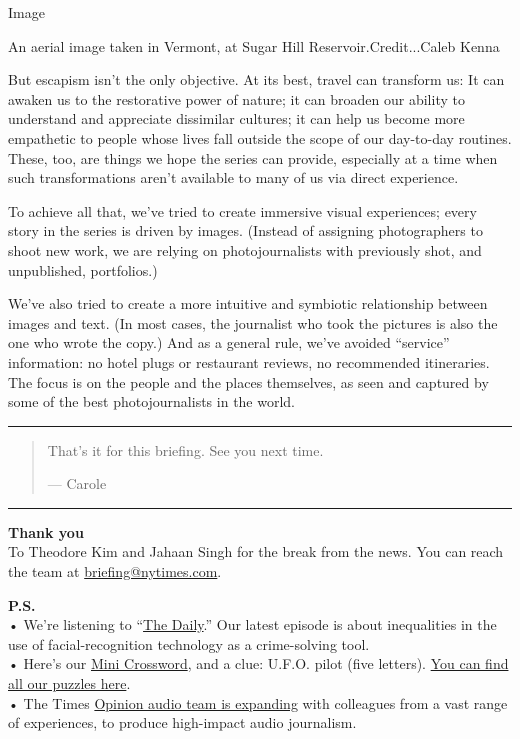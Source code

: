 Image

An aerial image taken in Vermont, at Sugar Hill Reservoir.Credit...Caleb
Kenna

But escapism isn't the only objective. At its best, travel can transform
us: It can awaken us to the restorative power of nature; it can broaden
our ability to understand and appreciate dissimilar cultures; it can
help us become more empathetic to people whose lives fall outside the
scope of our day-to-day routines. These, too, are things we hope the
series can provide, especially at a time when such transformations
aren't available to many of us via direct experience.

To achieve all that, we've tried to create immersive visual experiences;
every story in the series is driven by images. (Instead of assigning
photographers to shoot new work, we are relying on photojournalists with
previously shot, and unpublished, portfolios.)

We've also tried to create a more intuitive and symbiotic relationship
between images and text. (In most cases, the journalist who took the
pictures is also the one who wrote the copy.) And as a general rule,
we've avoided ``service'' information: no hotel plugs or restaurant
reviews, no recommended itineraries. The focus is on the people and the
places themselves, as seen and captured by some of the best
photojournalists in the world.

\begin{center}\rule{0.5\linewidth}{\linethickness}\end{center}

\begin{quote}
That's it for this briefing. See you next time.

--- Carole
\end{quote}

\begin{center}\rule{0.5\linewidth}{\linethickness}\end{center}

\textbf{Thank you}\\
To Theodore Kim and Jahaan Singh for the break from the news. You can
reach the team at
\href{mailto:briefing+pm@nytimes.com?subject=Briefing\%20Feedback}{briefing@nytimes.com}.

\textbf{P.S.}\\
• We're listening to ``\href{https://www.nytimes.com/thedaily}{The
Daily}.'' Our latest episode is about inequalities in the use of
facial-recognition technology as a crime-solving tool.\\
• Here's our \href{https://www.nytimes.com/crosswords/game/mini}{Mini
Crossword}, and a clue: U.F.O. pilot (five letters).
\href{https://www.nytimes.com/crosswords}{You can find all our puzzles
here}.\\
• The Times
\href{https://www.nytco.com/press/introducing-the-opinion-audio-team/}{Opinion
audio team is expanding} with colleagues from a vast range of
experiences, to produce high-impact audio journalism.

